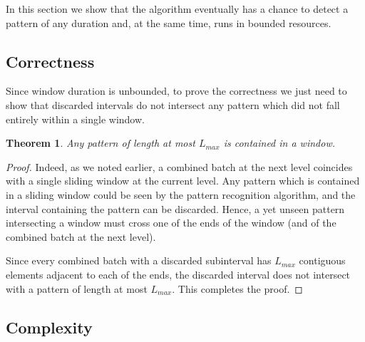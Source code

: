 \documentclass[runningheads,a4paper]{llncs}
\newtheorem{thm}{Theorem}
\begin{document}
In this section we show that the algorithm eventually has a chance to
detect a pattern of any duration and, at the same time, runs in
bounded resources.

\subsection{Correctness}

Since window duration is unbounded, to prove the correctness we just
need to show that discarded intervals do not intersect any
pattern which did not fall entirely within a single window.

\begin{thm}Any pattern of length at most $L_{max}$ is contained in 
    a window.
\end{thm}
\begin{proof}Indeed, as we noted earlier, a combined batch at the next
    level coincides with a single sliding window at the current level.
    Any pattern which is contained in a sliding window could be
    seen by the pattern recognition algorithm, and the interval
    containing the pattern can be discarded. Hence, a yet unseen
    pattern intersecting a window must cross one of the ends of the
    window (and of the combined batch at the next level). 

    Since every combined batch with a discarded subinterval has
    $L_{max}$ contiguous elements adjacent to each of the ends, 
    the discarded interval does not intersect with a pattern of length
    at most $L_{max}$. This completes the proof.
\end{proof}

\subsection{Complexity}
\end{document}
